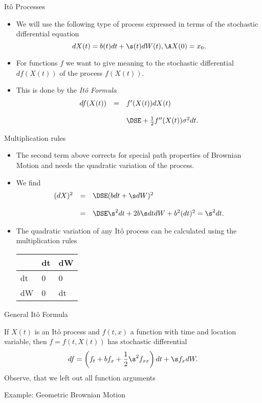 { It{\^o} Processes}
\begin{itemize}
\item<1-> We will use the following type of process expressed
in terms of the stochastic differential equation
$$
dX(t) = b(t) dt + \s(t) dW(t), \A X(0) = x_0.
$$
\item<2-> For functions $f$ we want to give  meaning to the stochastic differential
$df(X(t))$ of the process $f(X(t))$.
\item<3-> This is done by the {\it It{\^o} Formula}
$$
\begin{array}{lll}
df(X(t)) &=& f'(X(t)) dX(t)\\*[12pt]
&& \DSE+ \frac{1}{2} f''(X(t)) \sigma^2 dt.
\end{array}
$$
\end{itemize}

{Multiplication rules}
\begin{itemize}
\item<1-> The second term above corrects for special path properties of
Brownian Motion and needs the quadratic variation of the process.
\item<2-> We find
$$
\begin{array}{lll}
(d X)^2 &=&\DSE (b dt + \s dW)^2 \\*[12pt]
&=&\DSE \s^2 dt + 2 b \s dt dW + b^2 (dt)^2 = \s^2 dt.
\end{array}
$$
\item<3-> The quadratic variation of any It{\^o} process can be calculated
using the multiplication rules\\
\begin{center}
\begin{tabular}{|l|ll|}
\hline
& dt &dW \\\hline
dt& 0 & 0\\
dW & 0 &dt \\\hline
\end{tabular}
\end{center}
\end{itemize}

{ General It{\^o} Formula}

If $X(t)$ is an It{\^o} process  and $f(t,x)$ a function with time and location variable, then
$f = f(t,X(t))$ has stochastic differential
$$
df = \left(f_t + b f_x + \frac{1}{2} \s^2 f_{xx}\right) dt + \s
f_x dW.
$$
Observe, that we left out all function arguments

{ Example: Geometric Brownian Motion}

